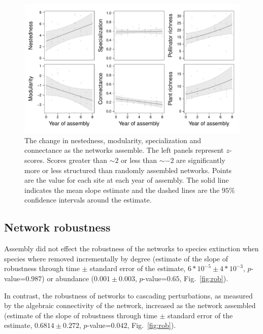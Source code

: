 \documentclass[12pt]{article}
\begin{document}
\begin{figure}
  \centering
  \includegraphics[width=.7\textwidth]{../analysis/networkLevel/figures/baci.pdf}
  \caption{The change in nestedness, modularity, specialization and
    connectance as the networks assemble. The left panels represent
    $z$-scores. Scores greater than $\sim 2$ or less than $\sim -2$
    are significantly more or less structured than randomly assembled
    networks. Points are the value for each site at each year of
    assembly. The solid line indicates the mean slope estimate and the
    dashed lines are the $95\%$ confidence intervals around the
    estimate.}
  \label{fig:baci}
\end{figure}
\clearpage

\subsection*{Network robustness}
Assembly did not effect the robustness of the networks to species
extinction when species where removed incrementally by degree
(estimate of the slope of robustness through time $\pm$ standard error
of the estimate, $6*10^{-5} \pm 4*10^{-3}$, $p$-value=$0.987$) or
abundance ($0.001 \pm 0.003$, $p$-value=$0.65$, Fig.~\ref{fig:rob}).

In contrast, the robustness of networks to cascading perturbations, as
measured by the algebraic connectivity of the network, increased as
the network assembled (estimate of the slope of robustness through
time $\pm$ standard error of the estimate, $0.6814 \pm 0.272$,
$p$-value=$0.042$, Fig.~\ref{fig:rob}).
\end{document}
